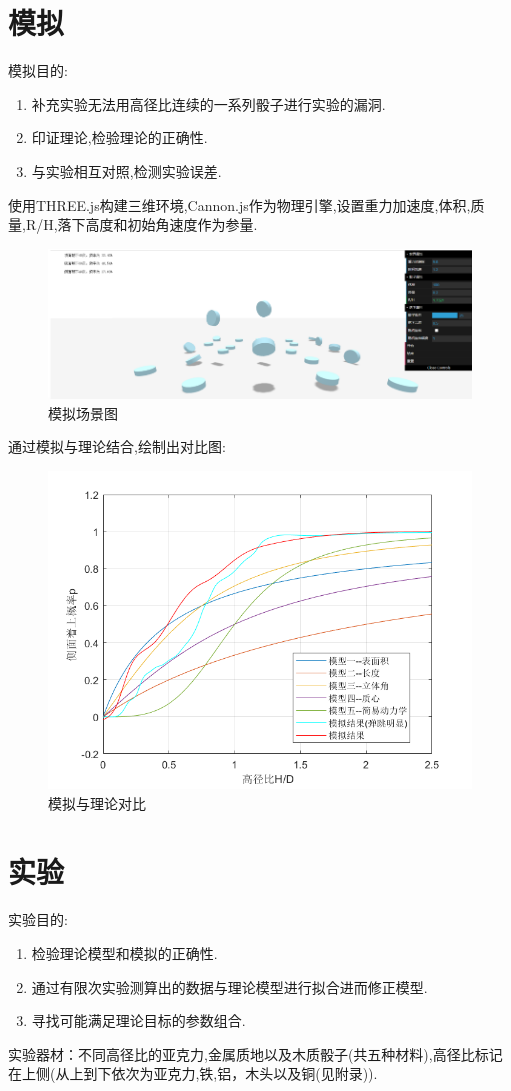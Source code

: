 \documentclass[UTF8]{gapd}
\begin{document}
\section{模拟}
模拟目的:
\begin{enumerate}
	\item 补充实验无法用高径比连续的一系列骰子进行实验的漏洞.
	\item 印证理论,检验理论的正确性.
	\item 与实验相互对照,检测实验误差.
\end{enumerate}
使用THREE.js构建三维环境,Cannon.js作为物理引擎,设置重力加速度,体积,质量,R/H,落下高度和初始角速度作为参量.
\begin{figure}[h]%
	\centering
	\includegraphics[width=0.8\columnwidth,height=0.15\textheight]{images/模拟场景}
	\caption{模拟场景图}
	\label{fig:P2}%
\end{figure}
通过模拟与理论结合,绘制出对比图:
\begin{figure}[h]%
	\centering
	\includegraphics[width=1.1\columnwidth]{images/实验理论对比}
	\caption{模拟与理论对比}
	\label{fig:P2}%
\end{figure}
\section{实验}
\label{sec:Experiment}
实验目的:
\begin{enumerate}
	\item 检验理论模型和模拟的正确性.
	\item 通过有限次实验测算出的数据与理论模型进行拟合进而修正模型.
	\item 寻找可能满足理论目标的参数组合.
\end{enumerate}
实验器材：不同高径比的亚克力,金属质地以及木质骰子(共五种材料),高径比标记在上侧(从上到下依次为亚克力,铁,铝，木头以及铜(见附录)).
\end{document}
